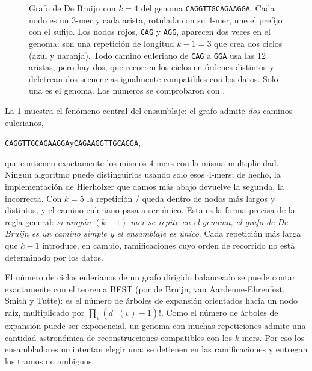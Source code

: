 \begin{figure}[t]
\caption[Grafo de De Bruijn de un genoma de juguete]{Grafo de De Bruijn con $k=4$ del genoma \texttt{CAGGTTGCAGAAGGA}. Cada nodo es un $3$-mer y cada arista, rotulada con su $4$-mer, une el prefijo con el sufijo. Los nodos rojos, \texttt{CAG} y \texttt{AGG}, aparecen dos veces en el genoma: son una repetición de longitud $k-1=3$ que crea dos ciclos (azul y naranja). Todo camino euleriano de \texttt{CAG} a \texttt{GGA} usa las 12 aristas, pero hay dos, que recorren los ciclos en órdenes distintos y deletrean dos secuencias igualmente compatibles con los datos. Solo una es el genoma. Los números se comprobaron con .}
\label{fig:08-dbg}
\end{figure}

La \cref{fig:08-dbg} muestra el fenómeno central del ensamblaje: el grafo admite \emph{dos} caminos eulerianos,
\begin{center}
\texttt{CAGGTTGCAGAAGGA}\qquad y\qquad \texttt{CAGAAGGTTGCAGGA},
\end{center}
que contienen exactamente los mismos $4$-mers con la misma multiplicidad. Ningún algoritmo puede distinguirlos usando solo esos $4$-mers; de hecho, la implementación de Hierholzer que damos más abajo devuelve la segunda, la incorrecta. Con $k=5$ la repetición / queda dentro de nodos más largos y distintos, y el camino euleriano pasa a ser único. Esta es la forma precisa de la regla general: \emph{si ningún $(k-1)$-mer se repite en el genoma, el grafo de De Bruijn es un camino simple y el ensamblaje es único}. Cada repetición más larga que $k-1$ introduce, en cambio, ramificaciones cuyo orden de recorrido no está determinado por los datos.

\begin{profundizacion}
El número de ciclos eulerianos de un grafo dirigido balanceado se puede contar exactamente con el teorema BEST (por de Bruijn, van Aardenne-Ehrenfest, Smith y Tutte): es el número de árboles de expansión orientados hacia un nodo raíz, multiplicado por $\prod_v (d^{+}(v)-1)!$. Como el número de árboles de expansión puede ser exponencial, un genoma con muchas repeticiones admite una cantidad astronómica de reconstrucciones compatibles con los $k$-mers. Por eso los ensambladores no intentan elegir una: se detienen en las ramificaciones y entregan los tramos no ambiguos.
\end{profundizacion}

